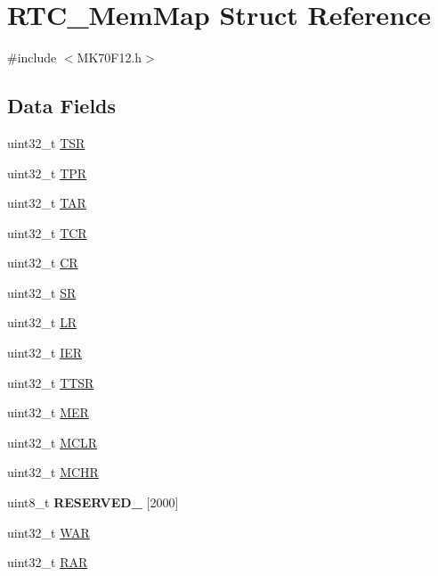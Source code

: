 \hypertarget{struct_r_t_c___mem_map}{}\section{R\+T\+C\+\_\+\+Mem\+Map Struct Reference}
\label{struct_r_t_c___mem_map}


{\ttfamily \#include $<$M\+K70\+F12.\+h$>$}

\subsection*{Data Fields}
\begin{DoxyCompactItemize}
\item 
uint32\+\_\+t \hyperlink{struct_r_t_c___mem_map_a4ca4d2878d99736cbff0e8b107a275f2}{T\+S\+R}
\item 
uint32\+\_\+t \hyperlink{struct_r_t_c___mem_map_a32641b62d548255bdf2164b457a2aaeb}{T\+P\+R}
\item 
uint32\+\_\+t \hyperlink{struct_r_t_c___mem_map_a500ab794376810b97e2b2e01658f330c}{T\+A\+R}
\item 
uint32\+\_\+t \hyperlink{struct_r_t_c___mem_map_ab816b0540497796070202cd2f5bc10ed}{T\+C\+R}
\item 
uint32\+\_\+t \hyperlink{struct_r_t_c___mem_map_a05c71be888cd40a4d91c631260d684d7}{C\+R}
\item 
uint32\+\_\+t \hyperlink{struct_r_t_c___mem_map_a82faed2f609de35e3b27d5fd27ba82e2}{S\+R}
\item 
uint32\+\_\+t \hyperlink{struct_r_t_c___mem_map_a6d1b4fe68ed53926b57392e7ad582469}{L\+R}
\item 
uint32\+\_\+t \hyperlink{struct_r_t_c___mem_map_a1db69b589f5bfc5faa12b9c54e7c8061}{I\+E\+R}
\item 
uint32\+\_\+t \hyperlink{struct_r_t_c___mem_map_a15cd6b1d2a7664e4280746a810d2583f}{T\+T\+S\+R}
\item 
uint32\+\_\+t \hyperlink{struct_r_t_c___mem_map_a1486bb59addc84a71638decf52c7d7b6}{M\+E\+R}
\item 
uint32\+\_\+t \hyperlink{struct_r_t_c___mem_map_a949f49a34b644f4bfa1bd05a3ed00322}{M\+C\+L\+R}
\item 
uint32\+\_\+t \hyperlink{struct_r_t_c___mem_map_a3b815cd903e7b828fd2b147aae5a77e1}{M\+C\+H\+R}
\item 
\hypertarget{struct_r_t_c___mem_map_a722b688c3198e587bc52fb0651075a5f}{}uint8\+\_\+t {\bfseries R\+E\+S\+E\+R\+V\+E\+D\+\_} \mbox{[}2000\mbox{]}\label{struct_r_t_c___mem_map_a722b688c3198e587bc52fb0651075a5f}

\item 
uint32\+\_\+t \hyperlink{struct_r_t_c___mem_map_aa3d2abe1fdd440a05339c38d377a2ee6}{W\+A\+R}
\item 
uint32\+\_\+t \hyperlink{struct_r_t_c___mem_map_a59094243dc3c0849c9bc20a2a809086c}{R\+A\+R}
\end{DoxyCompactItemize}


